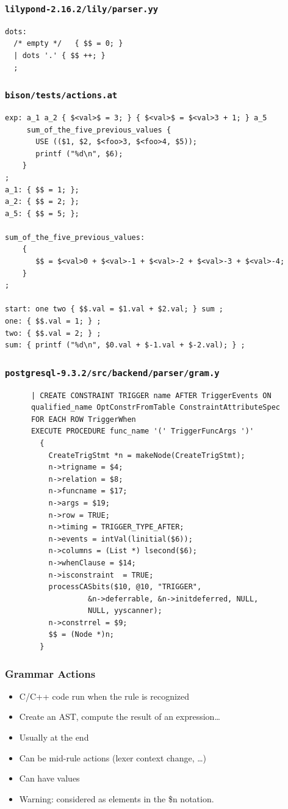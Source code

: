 \documentclass{beamer}
\begin{document}
\begin{frame}[fragile,shrink=25]
  \frametitle{\texttt{lilypond-2.16.2/lily/parser.yy}}
\begin{verbatim}
dots:
  /* empty */   { $$ = 0; }
  | dots '.' { $$ ++; }
  ;
\end{verbatim}
\end{frame}

\begin{frame}[fragile,shrink=25]
  \frametitle{\texttt{bison/tests/actions.at}}
\begin{verbatim}
exp: a_1 a_2 { $<val>$ = 3; } { $<val>$ = $<val>3 + 1; } a_5
     sum_of_the_five_previous_values {
       USE (($1, $2, $<foo>3, $<foo>4, $5));
       printf ("%d\n", $6);
    }
;
a_1: { $$ = 1; };
a_2: { $$ = 2; };
a_5: { $$ = 5; };

sum_of_the_five_previous_values:
    {
       $$ = $<val>0 + $<val>-1 + $<val>-2 + $<val>-3 + $<val>-4;
    }
;

start: one two { $$.val = $1.val + $2.val; } sum ;
one: { $$.val = 1; } ;
two: { $$.val = 2; } ;
sum: { printf ("%d\n", $0.val + $-1.val + $-2.val); } ;
\end{verbatim}
\end{frame}

\begin{frame}[fragile,shrink=25]
  \frametitle{\texttt{postgresql-9.3.2/src/backend/parser/gram.y}}
\begin{verbatim}
      | CREATE CONSTRAINT TRIGGER name AFTER TriggerEvents ON
      qualified_name OptConstrFromTable ConstraintAttributeSpec
      FOR EACH ROW TriggerWhen
      EXECUTE PROCEDURE func_name '(' TriggerFuncArgs ')'
        {
          CreateTrigStmt *n = makeNode(CreateTrigStmt);
          n->trigname = $4;
          n->relation = $8;
          n->funcname = $17;
          n->args = $19;
          n->row = TRUE;
          n->timing = TRIGGER_TYPE_AFTER;
          n->events = intVal(linitial($6));
          n->columns = (List *) lsecond($6);
          n->whenClause = $14;
          n->isconstraint  = TRUE;
          processCASbits($10, @10, "TRIGGER",
                   &n->deferrable, &n->initdeferred, NULL,
                   NULL, yyscanner);
          n->constrrel = $9;
          $$ = (Node *)n;
        }
\end{verbatim}
\end{frame}


\begin{frame}
  \frametitle{Grammar Actions}
    \begin{itemize}
      \item C/C++ code run when the rule is recognized
      \item Create an AST, compute the result of an expression\ldots
      \item Usually at the end
      \item Can be mid-rule actions (lexer context change, \ldots)
      \item Can have values
      \item Warning: considered as elements in the \$n notation.
    \end{itemize}
\end{frame}
\end{document}
